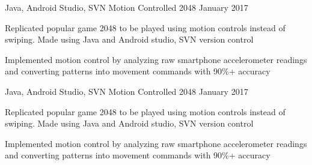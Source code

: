 \begin{cventries}
    \cventry
        {Java, Android Studio, SVN}
        {Motion Controlled 2048}
        {}
        {January 2017}
        {
          \begin{cvitems}
            \item {Replicated popular game 2048 to be played using motion controls instead of swiping. Made using Java and Android studio, SVN version control}
            \item {Implemented motion control by analyzing raw smartphone accelerometer readings and converting patterns into movement commands with 90\%+ accuracy }
          \end{cvitems}
        }
        
    \cventry
        {Java, Android Studio, SVN}
        {Motion Controlled 2048}
        {}
        {January 2017}
        {
          \begin{cvitems}
            \item {Replicated popular game 2048 to be played using motion controls instead of swiping. Made using Java and Android studio, SVN version control}
            \item {Implemented motion control by analyzing raw smartphone accelerometer readings and converting patterns into movement commands with 90\%+ accuracy }
          \end{cvitems}
        }


\end{cventries}

